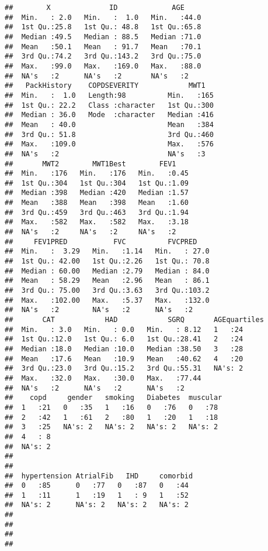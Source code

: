 \documentclass[
]{article}
\begin{document}
\begin{verbatim}
##        X              ID             AGE      
##  Min.   : 2.0   Min.   :  1.0   Min.   :44.0  
##  1st Qu.:25.8   1st Qu.: 48.8   1st Qu.:65.8  
##  Median :49.5   Median : 88.5   Median :71.0  
##  Mean   :50.1   Mean   : 91.7   Mean   :70.1  
##  3rd Qu.:74.2   3rd Qu.:143.2   3rd Qu.:75.0  
##  Max.   :99.0   Max.   :169.0   Max.   :88.0  
##  NA's   :2      NA's   :2       NA's   :2     
##   PackHistory    COPDSEVERITY            MWT1    
##  Min.   :  1.0   Length:98          Min.   :165  
##  1st Qu.: 22.2   Class :character   1st Qu.:300  
##  Median : 36.0   Mode  :character   Median :416  
##  Mean   : 40.0                      Mean   :384  
##  3rd Qu.: 51.8                      3rd Qu.:460  
##  Max.   :109.0                      Max.   :576  
##  NA's   :2                          NA's   :3    
##       MWT2        MWT1Best        FEV1     
##  Min.   :176   Min.   :176   Min.   :0.45  
##  1st Qu.:304   1st Qu.:304   1st Qu.:1.09  
##  Median :398   Median :420   Median :1.57  
##  Mean   :388   Mean   :398   Mean   :1.60  
##  3rd Qu.:459   3rd Qu.:463   3rd Qu.:1.94  
##  Max.   :582   Max.   :582   Max.   :3.18  
##  NA's   :2     NA's   :2     NA's   :2     
##     FEV1PRED           FVC          FVCPRED     
##  Min.   :  3.29   Min.   :1.14   Min.   : 27.0  
##  1st Qu.: 42.00   1st Qu.:2.26   1st Qu.: 70.8  
##  Median : 60.00   Median :2.79   Median : 84.0  
##  Mean   : 58.29   Mean   :2.96   Mean   : 86.1  
##  3rd Qu.: 75.00   3rd Qu.:3.63   3rd Qu.:103.2  
##  Max.   :102.00   Max.   :5.37   Max.   :132.0  
##  NA's   :2        NA's   :2      NA's   :2      
##       CAT            HAD            SGRQ       AGEquartiles
##  Min.   : 3.0   Min.   : 0.0   Min.   : 8.12   1   :24     
##  1st Qu.:12.0   1st Qu.: 6.0   1st Qu.:28.41   2   :24     
##  Median :18.0   Median :10.0   Median :38.50   3   :28     
##  Mean   :17.6   Mean   :10.9   Mean   :40.62   4   :20     
##  3rd Qu.:23.0   3rd Qu.:15.2   3rd Qu.:55.31   NA's: 2     
##  Max.   :32.0   Max.   :30.0   Max.   :77.44               
##  NA's   :2      NA's   :2      NA's   :2                   
##    copd     gender   smoking   Diabetes  muscular 
##  1   :21   0   :35   1   :16   0   :76   0   :78  
##  2   :42   1   :61   2   :80   1   :20   1   :18  
##  3   :25   NA's: 2   NA's: 2   NA's: 2   NA's: 2  
##  4   : 8                                          
##  NA's: 2                                          
##                                                   
##                                                   
##  hypertension AtrialFib   IHD     comorbid 
##  0   :85      0   :77   0   :87   0   :44  
##  1   :11      1   :19   1   : 9   1   :52  
##  NA's: 2      NA's: 2   NA's: 2   NA's: 2  
##                                            
##                                            
##                                            
## 
\end{verbatim}
\end{document}
